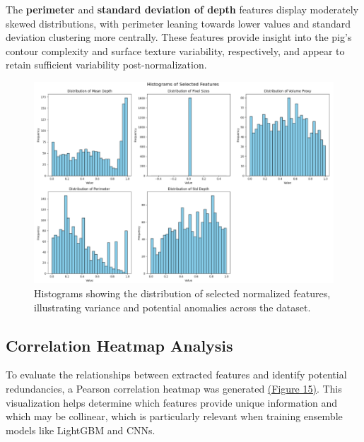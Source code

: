The \textbf{perimeter} and \textbf{standard deviation of depth} features display moderately skewed distributions, with perimeter leaning towards lower values and standard deviation clustering more centrally. These features provide insight into the pig's contour complexity and surface texture variability, respectively, and appear to retain sufficient variability post-normalization.

\newpage

\begin{figure}[h]
	\centering
	\includegraphics[height=0.45\textheight]{figures/Features Histogram}
	\caption{Histograms showing the distribution of selected normalized features, illustrating variance and potential anomalies across the dataset.}
	\label{fig:Features Histogram}
\end{figure}

\subsection{Correlation Heatmap Analysis}

To evaluate the relationships between extracted features and identify potential redundancies, a Pearson correlation heatmap was generated \hyperref[fig:Correlation Heatmap of Features]{(Figure 15)}. This visualization helps determine which features provide unique information and which may be collinear, which is particularly relevant when training ensemble models like LightGBM and CNNs.

\newpage

